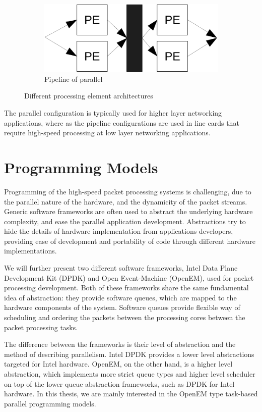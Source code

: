 \begin{figure}
  \begin{subfigure}[b]{0.475\textwidth}
    \centering
    \includegraphics[scale=.5]{images/pipeline-parallel.pdf}
    \caption[]%
    {{\small Pipeline of parallel}}
    \label{fig:pipeline-parallel}
  \end{subfigure}
  \caption[]
  {\small Different processing element architectures}
  \label{fig:processing-element-organization}
\end{figure}

The parallel configuration is typically used for higher layer networking applications, where as the pipeline configurations are used in line cards that require high-speed processing at low layer networking applications.

\section{Programming Models}
\label{sec:programming-models}

Programming of the high-speed packet processing systems is challenging, due to the parallel nature of the hardware, and the dynamicity of the packet streams. Generic software frameworks are often used to abstract the underlying hardware complexity, and ease the parallel application development. Abstractions try to hide the details of hardware implementation from applications developers, providing ease of development and portability of code through different hardware implementations.

We will further present two different software frameworks, Intel Data Plane Development Kit (DPDK) and Open Event-Machine (OpenEM), used for packet processing development. Both of these frameworks share the same fundamental idea of abstraction: they provide software queues, which are mapped to the hardware components of the system. Software queues provide flexible way of scheduling and ordering the packets between the processing cores between the packet processing tasks.

The difference between the frameworks is their level of abstraction and the method of describing parallelism. Intel DPDK provides a lower level abstractions targeted for Intel hardware. OpenEM, on the other hand, is a higher level abstraction, which implements more strict queue types and higher level scheduler on top of the lower queue abstraction frameworks, such as DPDK for Intel hardware. In this thesis, we are mainly interested in the OpenEM type task-based parallel programming models.

